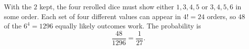With the $2$ kept, the four rerolled dice must show either $1,3,4,5$ or $3,4,5,6$ in some order. Each set of four different values can appear in $4!=24$ orders, so $48$ of the $6^4=1296$ equally likely outcomes work. The probability is
\[\dfrac{48}{1296}=\boxed{\dfrac{1}{27}}.\]
